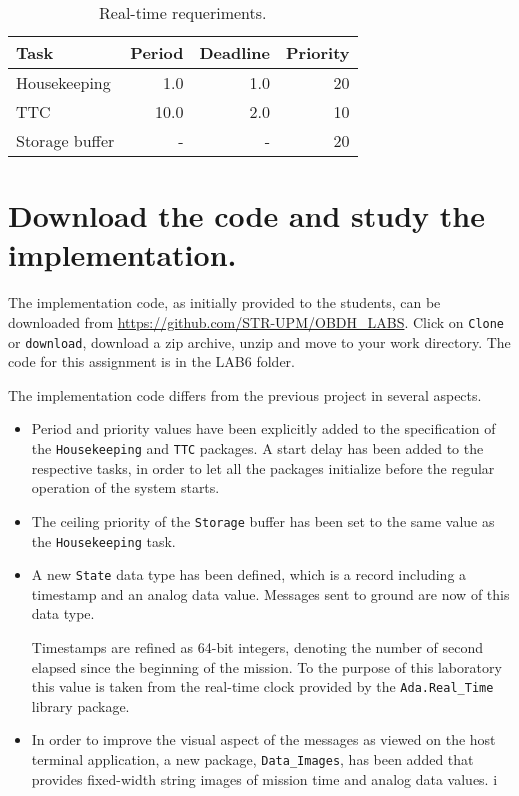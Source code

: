\begin{table}[htb]
\begin{center}
\begin{tabular}{|l|r|r|r|} \hline
Task & Period & Deadline & Priority\\ \hline
Housekeeping & 1.0 & 1.0 & 20 \\
TTC & 10.0 & 2.0 & 10 \\
Storage buffer & - & - & 20 \\ \hline
\end{tabular}
\caption{Real-time requeriments.}
\label{tb:requeriments}
\end{center}
\end{table}

\section{Download the code and study the implementation.}

The implementation code, as initially provided to the students, can be downloaded from \url{https://github.com/STR-UPM/OBDH\_LABS}. Click on {\tt Clone} or {\tt download}, download a zip archive, unzip and move to your work directory. The code for this assignment is in the LAB6 folder.

The implementation code differs from the previous project in several aspects.
\begin{itemize}
\item Period and priority values have been explicitly added to the specification of the {\tt Housekeeping} and {\tt TTC} packages. A start delay has been added to the respective tasks, in order to let all the packages initialize before the regular operation of the system starts.
\item The ceiling priority of the {\tt Storage} buffer has been set to the same value as the {\tt Housekeeping} task.
\item A new {\tt State} data type has been defined, which is a record including a timestamp and an analog data value. Messages sent to ground are now of this data type.

Timestamps are refined as 64-bit integers, denoting the number of second elapsed since the beginning of the mission. To the purpose of this laboratory this value is taken from the real-time clock provided by the {\tt Ada.Real\_Time} library package.
\item In order to improve the visual aspect of the messages as viewed on the host terminal application, a new package, {\tt Data\_Images}, has been added that provides fixed-width string images of mission time and analog data values.
i\end{itemize}

